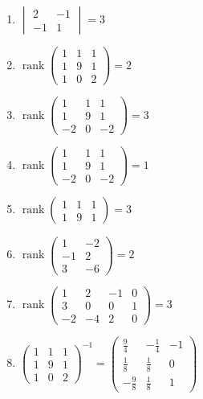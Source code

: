 \documentclass[11pt,a4paper]{article}
\begin{document}
\begin{enumerate}
\item $\displaystyle \begin{vmatrix} 2 & -1 \\ -1 & 1 \end{vmatrix} = 3$
\item $\displaystyle \operatorname{rank} \begin{pmatrix} 1 & 1 & 1 \\ 1 & 9 & 1 \\ 1 & 0 & 2 \end{pmatrix} = 2$
\item $\displaystyle \operatorname{rank} \begin{pmatrix} 1 & 1 & 1 \\ 1 & 9 & 1 \\ -2 & 0 & -2 \end{pmatrix} = 3$
\item $\displaystyle \operatorname{rank} \begin{pmatrix} 1 & 1 & 1 \\ 1 & 9 & 1 \\ -2 & 0 & -2 \end{pmatrix} = 1$
\item $\displaystyle \operatorname{rank} \begin{pmatrix} 1 & 1 & 1 \\ 1 & 9 & 1 \end{pmatrix} = 3$
\item $\displaystyle \operatorname{rank} \begin{pmatrix} 1 & -2 \\ -1 & 2 \\ 3 & -6 \end{pmatrix} = 2$
\item $\displaystyle \operatorname{rank} \begin{pmatrix} 1 & 2 & -1 & 0 \\ 3 & 0 & 0 & 1 \\ -2 & -4 & 2 & 0 \end{pmatrix} = 3$
\item $\displaystyle \begin{pmatrix} 1 & 1 & 1 \\ 1 & 9 & 1 \\ 1 & 0 & 2 \end{pmatrix}^{-1} = \begin{pmatrix} \frac{9}{4} & -\frac{1}{4} & -1 \\ \frac{1}{8} & \frac{1}{8} & 0 \\ -\frac{9}{8} & \frac{1}{8} & 1 \end{pmatrix}$

\end{enumerate}
\end{document}
